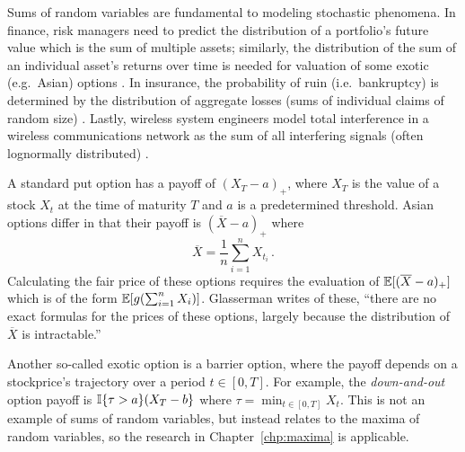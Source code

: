 Sums of random variables are fundamental to modeling stochastic phenomena. In finance, risk managers need to predict the distribution of a portfolio's future value which is the sum of multiple assets; similarly, the distribution of the sum of an individual asset's returns over time is needed for valuation of some exotic (e.g.\ Asian) options \cite{mcneil2015quantitative,Rueschendorf2013}. In insurance, the probability of ruin (i.e.\ bankruptcy) is determined by the distribution of aggregate losses (sums of individual claims of random size) \cite{klugman2012loss,asmussen2010ruin}. Lastly, wireless system engineers model total interference in a wireless communications network as the sum of all interfering signals (often lognormally distributed) \cite{fischione2007approximation}.

\begin{example}

A standard put option has a payoff of $(X_T - a)_+$, where $X_T$ is the value of a stock $X_t$ at the time of maturity $T$ and $a$ is a predetermined threshold. Asian options differ in that their payoff is $(\overline{X} - a)_+$ where
\[ \overline{X} = \frac1n \sum_{i=1}^n X_{t_i} \,. \]
Calculating the fair price of these options requires the evaluation of $\operatorname{{\mathbb E}}[ (\overline{X} - a)_+]$ which is of the form $\operatorname{{\mathbb E}}[ g(\sum_{i=1}^n X_i) ]$.
Glasserman \cite[p.\ 99]{glasserman2003monte} writes of these, ``there are no exact formulas for the prices of these options, largely because the distribution of $\overline{X}$ is intractable.''
\remQED
\end{example}

\begin{example}

Another so-called exotic option is a barrier option, where the payoff depends on a stockprice's trajectory over a period $t \in [0,T]$. For example, the \emph{down-and-out} option \cite{cont2010encyclopedia} payoff is $\mathbb{I}\{  \tau > a  \} (X_T - b\}$ where $\tau = \min_{t\in[0,T]} X_t$. This is not an example of sums of random variables, but instead relates to the maxima of random variables, so the research in Chapter~\ref{chp:maxima} is applicable.
\remQED
\end{example}

